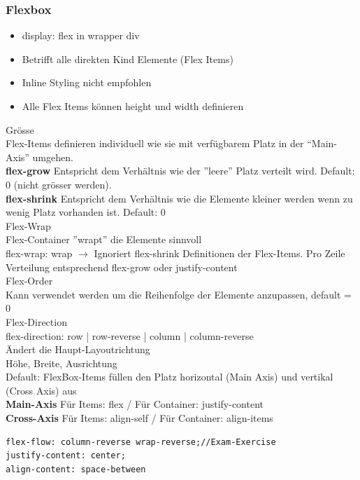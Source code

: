 \subsubsection{Flexbox}
\begin{itemize}
    \item display: flex in wrapper div
    \item Betrifft alle direkten Kind Elemente (Flex Items)
    \item Inline Styling nicht empfohlen
    \item Alle Flex Items können height und width definieren
\end{itemize}
\textcolor{subsectioncolor}{Grösse}\\
Flex-Items definieren individuell wie sie mit verfügbarem Platz in der “Main-Axis” umgehen.\\
\textbf{flex-grow} Entspricht dem Verhältnis wie der ''leere'' Platz verteilt wird. Default: 0 (nicht grösser werden).\\
\textbf{flex-shrink} Entspricht dem Verhältnis wie die Elemente kleiner werden wenn zu wenig Platz vorhanden ist. Default: 0\\
\textcolor{subsectioncolor}{Flex-Wrap}\\
Flex-Container ''wrapt'' die Elemente sinnvoll\\
flex-wrap: wrap $\rightarrow$ Ignoriert flex-shrink Definitionen der Flex-Items. Pro Zeile Verteilung entsprechend flex-grow oder justify-content\\
\textcolor{subsectioncolor}{Flex-Order}\\
Kann verwendet werden um die Reihenfolge der Elemente anzupassen, default = 0\\
\textcolor{subsectioncolor}{Flex-Direction}\\
flex-direction: row | row-reverse | column | column-reverse\\
Ändert die Haupt-Layoutrichtung\\
\textcolor{subsectioncolor}{Höhe, Breite, Ausrichtung}\\
Default: FlexBox-Items füllen den Platz horizontal (Main Axis) und vertikal (Cross Axis) aus\\
\textbf{Main-Axis} Für Items: flex / Für Container: justify-content\\
\textbf{Cross-Axis} Für Items: align-self / Für Container: align-items

\begin{lstlisting}
flex-flow: column-reverse wrap-reverse;//Exam-Exercise
justify-content: center;
align-content: space-between
\end{lstlisting}

